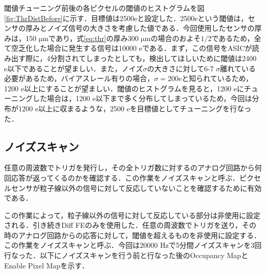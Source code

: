 閾値チューニング前後の各ピクセルの閾値のヒストグラムを図\ref{fig:ThrDistBefore}に示す．目標値は2500$\mathrm{e}$と設定した．2500$\mathrm{e}$という閾値は，センサの厚みとノイズ信号の大きさを考慮した値である．今回使用したセンサの厚みは，150 $\mathrm{\mu m}$であり，式\ref{eq:thr}の厚み300 $\mathrm{\mu m}$の場合のおよそ$1/2$であるため，全て空乏化した場合に発生する信号は10000 $\mathrm{e}$である．まず，この信号をASICが読み出す際に，4分割されてしまったとしても，検出してほしいために閾値は2400 $\mathrm{e}$以下であることが望ましい．また，ノイズ$\sigma$の大きさに対して6-7 $\sigma$離れている必要があるため，バイアスレール有りの場合，$\sigma = 200 \mathrm{e}$と知られているため，1200 $\mathrm{e}$以上にすることが望ましい．閾値のヒストグラムを見ると，1200 $\mathrm{e}$にチューニングした場合は，1200 $\mathrm{e}$以下まで多く分布してしまっているため，今回は分布が1200 $\mathrm{e}$以上に収まるような，2500 $\mathrm{e}$を目標値としてチューニングを行なった．

\subsection{ノイズスキャン}
任意の周波数でトリガを発行し，その全トリガ数に対するのアナログ回路から何回応答が返ってくるのかを確認する．この作業をノイズスキャンと呼ぶ．ピクセルセンサが粒子線以外の信号に対して反応していないことを確認するために有効である．\par
この作業によって，粒子線以外の信号に対して反応している部分は非使用に設定される．引き続きDiff FEのみを使用した．任意の周波数でトリガを送り，その時のアナログ回路からの応答に対して，閾値を超えるものを非使用に設定する．この作業をノイズスキャンと呼ぶ．今回は20000 $\mathrm{Hz}$で5分間ノイズスキャンを3回行なった．以下にノイズスキャンを行う前と行なった後のOccupancy MapとEnable Pixel Mapを示す．

